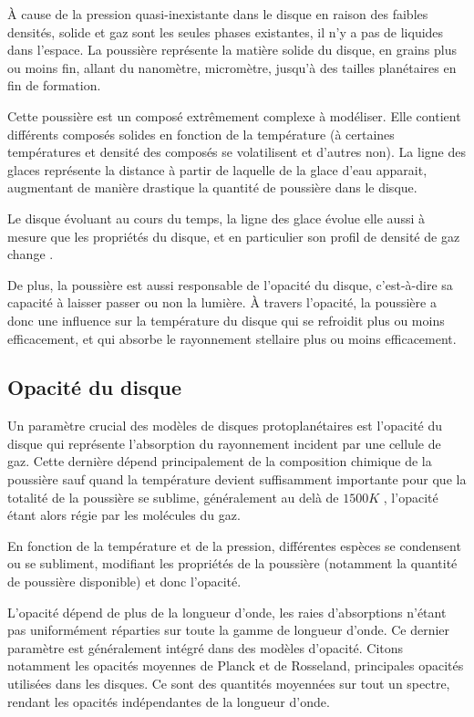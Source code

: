 À cause de la pression quasi-inexistante dans le disque en raison des faibles densités, solide et gaz sont les seules phases existantes, il n'y a pas de liquides dans l'espace. La poussière représente la matière solide du disque, en grains plus ou moins fin, allant du nanomètre, micromètre, jusqu'à des tailles planétaires en fin de formation. 

Cette poussière est un composé extrêmement complexe à modéliser. Elle contient différents composés solides en fonction de la température (à certaines températures et densité des composés se volatilisent et d'autres non). La ligne des glaces représente la distance à partir de laquelle de la glace d'eau apparait, augmentant de manière drastique la quantité de poussière dans le disque. 

Le disque évoluant au cours du temps, la ligne des glace évolue elle aussi à mesure que les propriétés du disque, et en particulier son profil de densité de gaz change \citep{dodsonrobinson2009icelines}.

\bigskip

De plus, la poussière est aussi responsable de l'opacité du disque, c'est-à-dire sa capacité à laisser passer ou non la lumière. À travers l'opacité, la poussière a donc une influence sur la température du disque qui se refroidit plus ou moins efficacement, et qui absorbe le rayonnement stellaire plus ou moins efficacement. 

\subsection{Opacité du disque}\label{sec:opacity}
Un paramètre crucial des modèles de disques protoplanétaires est l'opacité du disque qui représente l'absorption du rayonnement incident par une cellule de gaz. Cette dernière dépend principalement de la composition chimique de la poussière sauf quand la température devient suffisamment importante pour que la totalité de la poussière se sublime, généralement au delà de $1500\unit{K}$ \citep{pollack1994composition}, l'opacité étant alors régie par les molécules du gaz.

En fonction de la température et de la pression, différentes espèces se condensent ou se subliment, modifiant les propriétés de la poussière (notamment la quantité de poussière disponible) et donc l'opacité.

L'opacité dépend de plus de la longueur d'onde, les raies d'absorptions n'étant pas uniformément réparties sur toute la gamme de longueur d'onde. Ce dernier paramètre est généralement intégré dans des modèles d'opacité. Citons notamment les opacités moyennes de Planck et de Rosseland, principales opacités utilisées dans les disques. Ce sont des quantités moyennées sur tout un spectre, rendant les opacités indépendantes de la longueur d'onde. 

